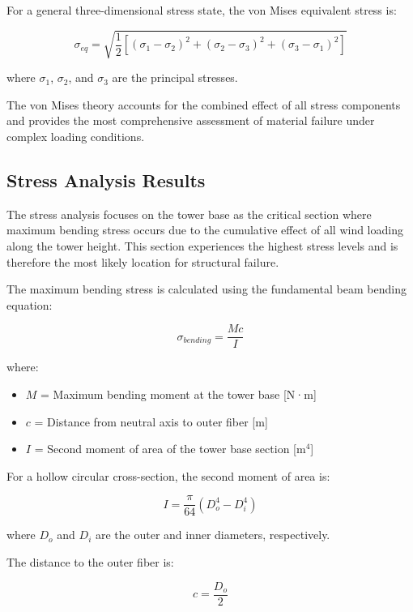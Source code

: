 \documentclass[12pt]{article}
\begin{document}
For a general three-dimensional stress state, the von Mises equivalent stress is:

\begin{equation}
\sigma_{eq} = \sqrt{\frac{1}{2}[(\sigma_1 - \sigma_2)^2 + (\sigma_2 - \sigma_3)^2 + (\sigma_3 - \sigma_1)^2]}
\end{equation}

where $\sigma_1$, $\sigma_2$, and $\sigma_3$ are the principal stresses.

The von Mises theory accounts for the combined effect of all stress components and provides the most comprehensive assessment of material failure under complex loading conditions.

\subsection{Stress Analysis Results}

The stress analysis focuses on the tower base as the critical section where maximum bending stress occurs due to the cumulative effect of all wind loading along the tower height. This section experiences the highest stress levels and is therefore the most likely location for structural failure.

The maximum bending stress is calculated using the fundamental beam bending equation:

\begin{equation}
\sigma_{bending} = \frac{Mc}{I}
\end{equation}

where:
\begin{itemize}
    \item $M$ = Maximum bending moment at the tower base [N·m]
    \item $c$ = Distance from neutral axis to outer fiber [m]
    \item $I$ = Second moment of area of the tower base section [m$^4$]
\end{itemize}

For a hollow circular cross-section, the second moment of area is:

\begin{equation}
I = \frac{\pi}{64}(D_o^4 - D_i^4)
\end{equation}

where $D_o$ and $D_i$ are the outer and inner diameters, respectively.

The distance to the outer fiber is:

\begin{equation}
c = \frac{D_o}{2}
\end{equation}
\end{document}
